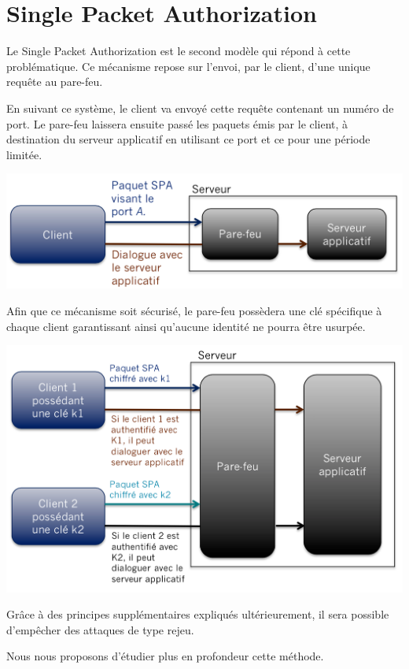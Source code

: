 \chapter{Single Packet Authorization}

Le Single Packet Authorization est le second modèle qui répond à cette problématique. Ce mécanisme repose sur l'envoi, par le client, d'une unique requête au pare-feu.

En suivant ce système, le client va envoyé cette requête contenant un numéro de port. Le pare-feu laissera ensuite passé les paquets émis par le client, à destination du serveur applicatif en utilisant ce port et ce pour une période limitée.
 
\includegraphics[scale=0.5]{spa_general_1}

Afin que ce mécanisme soit sécurisé, le pare-feu possèdera une clé spécifique à chaque client garantissant ainsi qu'aucune identité ne pourra être usurpée.

\includegraphics[scale=0.5]{spa_general_2}

Grâce à des principes supplémentaires expliqués ultérieurement, il sera possible d'empêcher des attaques de type rejeu.

Nous nous proposons d'étudier plus en profondeur cette méthode.

